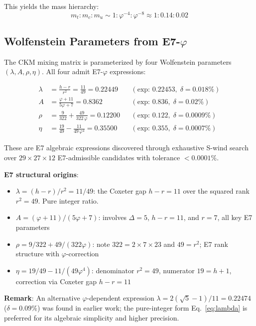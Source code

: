 \documentclass[11pt,a4paper]{article}
\begin{document}
This yields the mass hierarchy:
\begin{equation}
m_t : m_c : m_u \sim 1 : \varphi^{-4} : \varphi^{-8} \approx 1 : 0.14 : 0.02
\end{equation}

\subsection{Wolfenstein Parameters from E7-$\varphi$}

The CKM mixing matrix is parameterized by four Wolfenstein parameters $(\lambda, A, \rho, \eta)$. All four admit E7-$\varphi$ expressions:

\begin{align}
\lambda &= \frac{h - r}{r^2} = \frac{11}{49} = 0.22449 && (\text{exp: } 0.22453, \;\delta = 0.018\%) \label{eq:lambda} \\
A &= \frac{\varphi + 11}{5\varphi + 7} = 0.8362 && (\text{exp: } 0.836, \;\delta = 0.02\%) \\
\rho &= \frac{9}{322} + \frac{49}{322\,\varphi} = 0.12200 && (\text{exp: } 0.122, \;\delta = 0.0009\%) \\
\eta &= \frac{19}{49} - \frac{11}{49\,\varphi^4} = 0.35500 && (\text{exp: } 0.355, \;\delta = 0.0007\%)
\end{align}

These are E7 algebraic expressions discovered through exhaustive S-wind search over $29 \times 27 \times 12$ E7-admissible candidates with tolerance $< 0.0001\%$.

\textbf{E7 structural origins}:
\begin{itemize}
\item $\lambda = (h-r)/r^2 = 11/49$: the Coxeter gap $h - r = 11$ over the squared rank $r^2 = 49$. Pure integer ratio.
\item $A = (\varphi + 11)/(5\varphi + 7)$: involves $\Delta = 5$, $h - r = 11$, and $r = 7$, all key E7 parameters
\item $\rho = 9/322 + 49/(322\varphi)$: note $322 = 2 \times 7 \times 23$ and $49 = r^2$; E7 rank structure with $\varphi$-correction
\item $\eta = 19/49 - 11/(49\varphi^4)$: denominator $r^2 = 49$, numerator $19 = h+1$, correction via Coxeter gap $h-r = 11$
\end{itemize}

\textbf{Remark}: An alternative $\varphi$-dependent expression $\lambda = 2(\sqrt{5}-1)/11 = 0.22474$ ($\delta = 0.09\%$) was found in earlier work; the pure-integer form Eq.~\eqref{eq:lambda} is preferred for its algebraic simplicity and higher precision.
\end{document}
